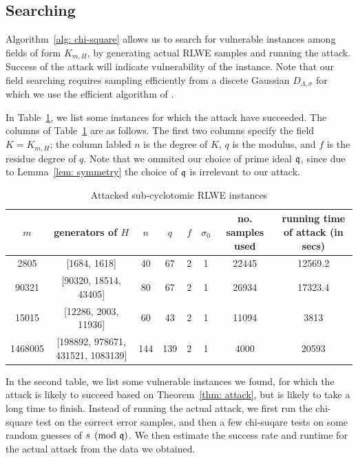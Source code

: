 \documentclass{amsart}
\begin{document}
\subsection{Searching}

Algorithm~\ref{alg: chi-square} allows us to search for vulnerable instances among fields of form $K_{m,H}$, by generating actual RLWE samples and running the attack. Success of the attack will indicate vulnerability of the instance. Note that our field searching requires sampling efficiently from a discete Gaussian $D_{\Lambda, \sigma}$ for which we use the efficient algorithm of \cite{gentry2008trapdoors}.

In Table~\ref{tab: attacked}, we list some instances for which the attack have succeeded. The columns of Table~\ref{tab: attacked} are as follows. The first two columns specify the field $K = K_{m,H}$; the column labled $n$ is the degree of $K$, $q$ is the modulus, and $f$ is the residue degree of $q$. Note that we ommited our choice of prime ideal $\mathfrak{q}$, since due to Lemma~\ref{lem: symmetry} the choice of $\mathfrak{q}$ is irrelevant to our attack.

\begin{table}[H] \label{tab: attacked}
\caption{Attacked sub-cyclotomic RLWE instances}
\begin{tabular}{c|c|c|c|c|c|c|c}
$m$ & generators of $H$ & $n$ & $q$ & $f$ & $\sigma_0$ & no. samples used & running time of attack (in secs) \\ \hline
2805 &  [1684, 1618] & 40 & 67 & 2 & 1 & 22445 & 12569.2 \\
90321 & [90320, 18514, 43405] & 80 & 67 & 2 & 1 & 26934 & 17323.4 \\
15015 & [12286, 2003, 11936] & 60 & 43 & 2 & 1 & 11094 & 3813 \\
1468005 & [198892, 978671, 431521, 1083139] & 144 & 139 & 2 & 1 &  4000 &  20593 \\
\end{tabular}
\end{table}

In the second table, we list some vulnerable instances we found, for which the attack is likely to succeed based on
Theorem~\ref{thm: attack}, but is likely to take a long time to finish. Instead of running the actual attack, we first run the chi-square test on the correct error samples, and then a few chi-suqare tests on some random guesses of $s \pmod{\mathfrak{q}}$. We then estimate the success rate and runtime for the actual attack from the data we obtained.
\end{document}
